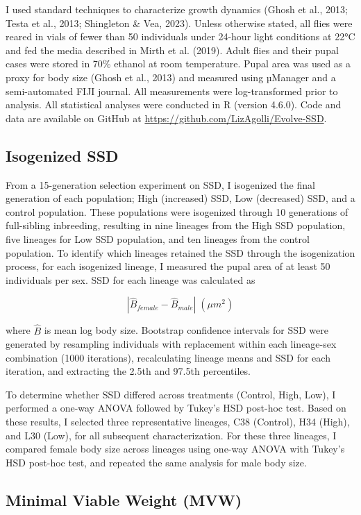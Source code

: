 \documentclass[12pt,reqno,oneside]{report}
\begin{document}
I used standard techniques to characterize growth dynamics (Ghosh et al., 2013; Testa et al., 2013; Shingleton \& Vea, 2023). Unless otherwise stated, all flies were reared in vials of fewer than 50 individuals under 24-hour light conditions at 22\si{\celsius} and fed the media described in Mirth et al. (2019). Adult flies and their pupal cases were stored in 70\% ethanol at room temperature. Pupal area was used as a proxy for body size (Ghosh et al., 2013) and measured using µManager and a semi-automated FIJI journal. All measurements were log-transformed prior to analysis. All statistical analyses were conducted in R (version 4.6.0). Code and data are available on GitHub at \url{https://github.com/LizAgolli/Evolve-SSD}.

\subsection{Isogenized SSD}

From a 15-generation selection experiment on SSD, I isogenized the final generation of each population; High (increased) SSD, Low (decreased) SSD, and a control population. These populations were isogenized through 10 generations of full-sibling inbreeding, resulting in nine lineages from the High SSD population, five lineages for Low SSD population, and ten lineages from the control population. To identify which lineages retained the SSD through the isogenization process, for each isogenized lineage, I measured the pupal area of at least 50 individuals per sex. SSD for each lineage was calculated as

\[|\hat{B}_{female} - \hat{B}_{male}| \; (\mu m^2)\]

\noindent where $\hat{B}$ is mean log body size. Bootstrap confidence intervals for SSD were generated by resampling individuals with replacement within each lineage-sex combination (1000 iterations), recalculating lineage means and SSD for each iteration, and extracting the 2.5th and 97.5th percentiles. 

To determine whether SSD differed across treatments (Control, High, Low), I performed a one-way ANOVA followed by Tukey's HSD post-hoc test. Based on these results, I selected three representative lineages, C38 (Control), H34 (High), and L30 (Low), for all subsequent characterization. For these three lineages, I compared female body size across lineages using one-way ANOVA with Tukey's HSD post-hoc test, and repeated the same analysis for male body size.

\subsection{Minimal Viable Weight (MVW)}
\end{document}
